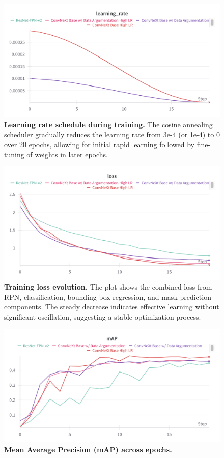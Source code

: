 \documentclass[twocolumn,a4paper]{article}
\begin{document}
\begin{figure}[H]
\centering
\includegraphics[width=0.95\linewidth]{figs/lr}
\caption{\textbf{Learning rate schedule during training.} The cosine annealing scheduler gradually reduces the learning rate from 3e-4 (or 1e-4) to 0 over 20 epochs, allowing for initial rapid learning followed by fine-tuning of weights in later epochs.}
\label{fig:lr}
\end{figure}

\begin{figure}[H]
\centering
\includegraphics[width=0.95\linewidth]{figs/loss}
\caption{\textbf{Training loss evolution.} The plot shows the combined loss from RPN, classification, bounding box regression, and mask prediction components. The steady decrease indicates effective learning without significant oscillation, suggesting a stable optimization process.}
\label{fig:loss}
\end{figure}

\begin{figure}[H]
\centering
\includegraphics[width=0.95\linewidth]{figs/map}
\caption{\textbf{Mean Average Precision (mAP) across epochs.}}
\label{fig:map}
\end{figure}
\end{document}
